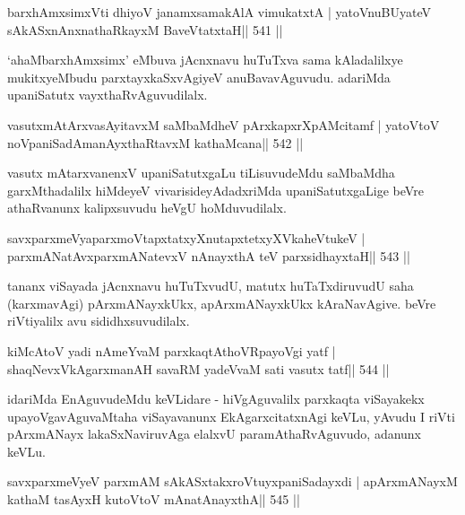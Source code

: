 
\begin{shl}
barxhAmxsimxVti dhiyoV janamxsamakAlA vimukatxtA |
yatoV\s nuBUyateV sAkASxnAnxnathaRkayxM BaveVtatxtaH\hfill || 541 ||
\end{shl}

\begin{artha}
`ahaMbarxhAmxsimx' eMbuva jAcnxnavu huTuTxva sama kAladalilxye   mukitxyeMbudu parxtayxkaSxvAgiyeV anuBavavAguvudu. adariMda   upaniSatutx vayxthaRvAguvudilalx.
\end{artha}

\begin{shl}
vasutxmAtArxvasAyitavxM saMbaMdheV pArxkapxrXpAMcitamf |
yatoV\s toV noVpaniSadAmanAyxthaRtavxM kathaMcana\hfill || 542 ||
\end{shl}

\begin{artha}
vasutx mAtarxvanenxV upaniSatutxgaLu tiLisuvudeMdu saMbaMdha garxMthadalilx hiMdeyeV vivarisideyAdadxriMda upaniSatutxgaLige beVre athaRvanunx kalipxsuvudu heVgU hoMduvudilalx.
\end{artha}



\begin{shl}
savxparxmeVyaparxmoVtapxtatxyXnutapxtetxyXVkaheVtukeV |
parxmANatAvxparxmANatevxV nAnayxthA teV parxsidhayxtaH\hfill || 543 ||
\end{shl}

\begin{artha}
tananx viSayada jAcnxnavu huTuTxvudU, matutx huTaTxdiruvudU saha (karxmavAgi) pArxmANayxkUkx, apArxmANayxkUkx kAraNavAgive. beVre riVtiyalilx avu sididhxsuvudilalx.
\end{artha}

\begin{shl}
kiMcAtoV yadi nAmeYvaM parxkaqtAthoVRpayoVgi yatf |
shaqNevxVkAgarxmanAH savaRM yadeVvaM sati vasutx tatf\hfill || 544 ||
\end{shl}

\begin{artha}
idariMda EnAguvudeMdu keVLidare - hiVgAguvalilx parxkaqta viSayakekx upayoVgavAguvaMtaha viSayavanunx EkAgarxcitatxnAgi keVLu, yAvudu I riVti pArxmANayx lakaSxNaviruvAga elalxvU paramAthaRvAguvudo, adanunx keVLu.
\end{artha}

\begin{shl}
savxparxmeVyeV parxmAM sAkASxtakxroVtuyxpaniSadayxdi |
apArxmANayxM kathaM tasAyxH kutoV\s toV mAnatA\s nayxthA\hfill || 545 ||
\end{shl}

